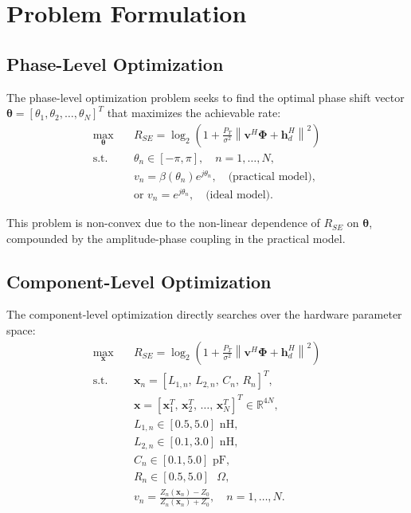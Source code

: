 \documentclass[12pt,a4paper]{article}
\newcommand{\vect}[1]{\boldsymbol{#1}}
\newcommand{\mat}[1]{\mathbf{#1}}
\newcommand{\norm}[1]{\left\|#1\right\|}
\begin{document}
\section{Problem Formulation}
\label{sec:problem_formulation}

\subsection{Phase-Level Optimization}

The phase-level optimization problem seeks to find the optimal phase shift vector $\vect{\theta} = [\theta_1, \theta_2, \ldots, \theta_N]^T$ that maximizes the achievable rate:
\begin{equation}
    \begin{aligned}
        \max_{\vect{\theta}} \quad & R_{SE} = \log_2\left(1 + \frac{P_T}{\sigma^2} \norm{\vect{v}^H \mat{\Phi} + \mat{h}_d^H}^2\right) \\
        \text{s.t.} \quad & \theta_n \in [-\pi, \pi], \quad n = 1, \ldots, N, \\
        & v_n = \beta(\theta_n) e^{j\theta_n}, \quad \text{(practical model)}, \\
        & \text{or } v_n = e^{j\theta_n}, \quad \text{(ideal model)}.
    \end{aligned}
    \label{eq:phase_optimization}
\end{equation}

This problem is non-convex due to the non-linear dependence of $R_{SE}$ on $\vect{\theta}$, compounded by the amplitude-phase coupling in the practical model.

\subsection{Component-Level Optimization}

The component-level optimization directly searches over the hardware parameter space:
\begin{equation}
    \begin{aligned}
        \max_{\mat{x}} \quad & R_{SE} = \log_2\left(1 + \frac{P_T}{\sigma^2} \norm{\vect{v}^H \mat{\Phi} + \mat{h}_d^H}^2\right) \\
        \text{s.t.} \quad & \mat{x}_n = [L_{1,n},\, L_{2,n},\, C_n,\, R_n]^T, \\
        & \mat{x} = [\mat{x}_1^T,\, \mat{x}_2^T,\, \ldots,\, \mat{x}_N^T]^T \in \mathbb{R}^{4N}, \\
        & L_{1,n} \in [0.5, 5.0] \text{ nH}, \\
        & L_{2,n} \in [0.1, 3.0] \text{ nH}, \\
        & C_n \in [0.1, 5.0] \text{ pF}, \\
        & R_n \in [0.5, 5.0] \text{ $\Omega$}, \\
        & v_n = \frac{Z_n(\mat{x}_n) - Z_0}{Z_n(\mat{x}_n) + Z_0}, \quad n = 1, \ldots, N.
    \end{aligned}
    \label{eq:component_optimization}
\end{equation}
\end{document}
